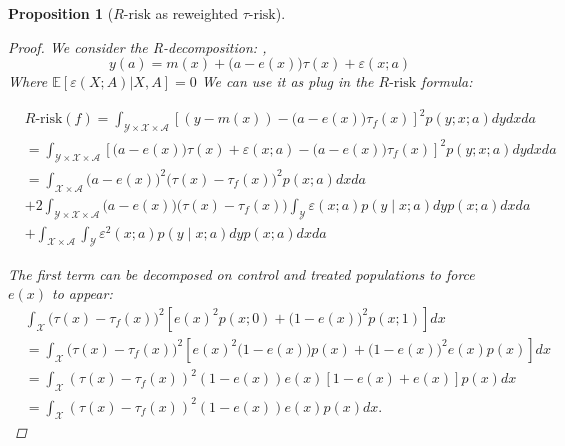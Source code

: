 \documentclass{report}
\newtheorem{proposition*}{Proposition}
\newtheorem{proof}{Proof}
\begin{document}
\begin{appendices}
\begin{proposition*}[$R\text{-risk}$ as reweighted $\tau
        \text{-risk}$]
    \begin{proof}

      We consider the R-decomposition: \citep{robinson_rootnconsistent_1988},
      \begin{equation}\label{apd:eq:r_decomposition}
        y(a) = m(x) + \big( a - e(x) \big) \tau(x) + \varepsilon(x; a)
      \end{equation}
      Where $\mathbb E[\varepsilon(X; A)|X, A] = 0$ We can use it as plug in the
      $R\text{-risk}$ formula:

      \begin{align*}
         & R\text {-risk}(f) =\int_{\mathcal{Y} \times \mathcal{X} \times \mathcal{A}}[(y-m(x))-\big(a-e(x)\big) \tau_f(x)]^{2} p(y ; x ; a) d y d x d a                                     \\
         & =\int_{\mathcal{Y} \times \mathcal{X} \times \mathcal{A}} \left[\big(a-e(x)\big)\tau(x)+\varepsilon(x ; a)-\big(a-e(x)\big) \tau_f(x)\right]^{2} p(y ; x ; a) d y d x da          \\
         & =\int_{\mathcal{X} \times \mathcal{A}}\big(a-e(x)\big)^{2}\big(\tau(x)- \tau_f(x)\big)^{2} p(x ; a) d x d a                                                                       \\
         & + 2  \int_{\mathcal{Y} \times \mathcal{X} \times \mathcal{A}}\big(a-e(x)\big)\big(\tau(x)-\tau_f(x)\big)  \int_{\mathcal{Y}} \varepsilon(x ; a) p(y \mid x ; a) d y p(x ; a)dx da \\
         & +\int_{\mathcal{X} \times \mathcal{A}} \int_{\mathcal{Y}} \varepsilon^{2}(x ; a) p(y \mid x ; a) d y p(x ; a) d x d a
      \end{align*}

      The first term can be decomposed on control and treated populations to force
      $e(x)$ to appear:
      \begin{align*}
         & \int_{\mathcal{X}}\big(\tau(x)-\tau_f(x)\big)^{2}\left[e(x)^{2}p(x;0) + \big(1-e(x)\big)^{2} p(x;1)\right] d x                    \\
         & =\int_{\mathcal{X}}\big(\tau(x)-\tau_f(x)\big)^{2}  \left[e(x)^{2}\big(1-e(x)\big)p(x) + \big(1-e(x)\big)^{2}e(x) p(x)\right] d x \\
         & =\int_{\mathcal{X}}(\tau(x)-\tau_f(x))^{2}(1-e(x)) e(x)[1-e(x)+e(x)] p(x) d x                                                     \\ &=\int_{\mathcal{X}}(\tau(x)-\tau_f(x))^{2}(1-e(x)) e(x) p(x) d x.
      \end{align*}


\end{proof}
\end{proposition*}
\end{appendices}
\end{document}
